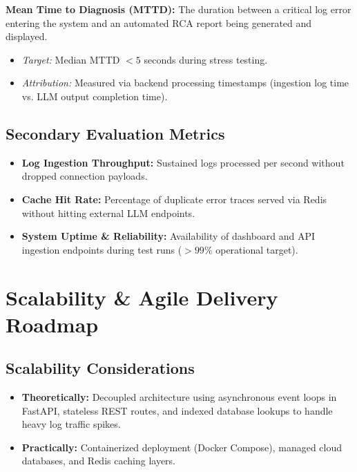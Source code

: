 \documentclass[11pt,a4paper]{article}
\begin{document}
\textbf{Mean Time to Diagnosis (MTTD):} The duration between a critical log error entering the system and an automated RCA report being generated and displayed.

\begin{itemize}[leftmargin=0.7cm]

\item \textit{Target:} Median MTTD $< 5$ seconds during stress testing.

\item \textit{Attribution:} Measured via backend processing timestamps (ingestion log time vs. LLM output completion time).

\end{itemize}

\subsection{Secondary Evaluation Metrics}

\begin{itemize}[leftmargin=0.7cm]

\item \textbf{Log Ingestion Throughput:} Sustained logs processed per second without dropped connection payloads.

\item \textbf{Cache Hit Rate:} Percentage of duplicate error traces served via Redis without hitting external LLM endpoints.

\item \textbf{System Uptime \& Reliability:} Availability of dashboard and API ingestion endpoints during test runs ($>99\%$ operational target).

\end{itemize}


\section{Scalability \& Agile Delivery Roadmap}

\subsection{Scalability Considerations}

\begin{itemize}[leftmargin=0.7cm]

\item \textbf{Theoretically:} Decoupled architecture using asynchronous event loops in FastAPI, stateless REST routes, and indexed database lookups to handle heavy log traffic spikes.

\item \textbf{Practically:} Containerized deployment (Docker Compose), managed cloud databases, and Redis caching layers.

\end{itemize}
\end{document}
